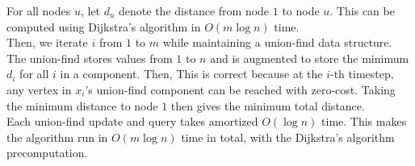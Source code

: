 \documentclass{article}
\begin{document}
  For all nodes $u$, let $d_u$ denote the distance from node $1$ to node $u$. This can be computed using Dijkstra's algorithm in $O(m\log n)$ time. \\

  Then, we iterate $i$ from $1$ to $m$ while maintaining a union-find data structure. The union-find stores values from $1$ to $n$ and is augmented to store the minimum $d_i$ for all $i$ in a component. Then,
  This is correct because at the $i$-th timestep, any vertex in $x_i$'s union-find component can be reached with zero-cost. Taking the minimum distance to node $1$ then gives the minimum total distance. \\

  Each union-find update and query takes amortized $O(\log n)$ time. This makes the algorithm run in $O(m\log n)$ time in total, with the Dijkstra's algorithm precomputation.
  
\end{document}
